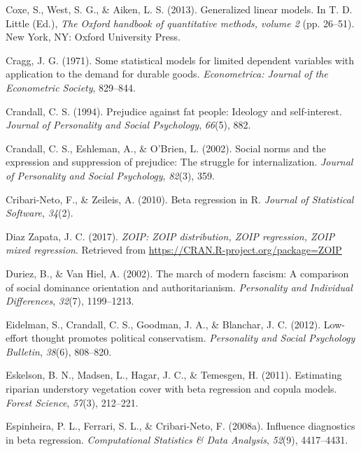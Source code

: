 \documentclass[english,man]{apa6}
\newcounter{author}
\theoremstyle{definition}
\theoremstyle{definition}
\theoremstyle{remark}
\begin{document}
\hypertarget{ref-coxe2013generalized}{}
Coxe, S., West, S. G., \& Aiken, L. S. (2013). Generalized linear
models. In T. D. Little (Ed.), \emph{The Oxford handbook of quantitative
methods, volume 2} (pp. 26--51). New York, NY: Oxford University Press.

\hypertarget{ref-cragg1971some}{}
Cragg, J. G. (1971). Some statistical models for limited dependent
variables with application to the demand for durable goods.
\emph{Econometrica: Journal of the Econometric Society}, 829--844.

\hypertarget{ref-crandall1994prejudice}{}
Crandall, C. S. (1994). Prejudice against fat people: Ideology and
self-interest. \emph{Journal of Personality and Social Psychology},
\emph{66}(5), 882.

\hypertarget{ref-crandall2002social}{}
Crandall, C. S., Eshleman, A., \& O'Brien, L. (2002). Social norms and
the expression and suppression of prejudice: The struggle for
internalization. \emph{Journal of Personality and Social Psychology},
\emph{82}(3), 359.

\hypertarget{ref-cribarineto2010beta}{}
Cribari-Neto, F., \& Zeileis, A. (2010). Beta regression in R.
\emph{Journal of Statistical Software}, \emph{34}(2).

\hypertarget{ref-zoip2017}{}
Diaz Zapata, J. C. (2017). \emph{ZOIP: ZOIP distribution, ZOIP
regression, ZOIP mixed regression}. Retrieved from
\url{https://CRAN.R-project.org/package=ZOIP}

\hypertarget{ref-duriez2002march}{}
Duriez, B., \& Van Hiel, A. (2002). The march of modern fascism: A
comparison of social dominance orientation and authoritarianism.
\emph{Personality and Individual Differences}, \emph{32}(7), 1199--1213.

\hypertarget{ref-eidelman2012low}{}
Eidelman, S., Crandall, C. S., Goodman, J. A., \& Blanchar, J. C.
(2012). Low-effort thought promotes political conservatism.
\emph{Personality and Social Psychology Bulletin}, \emph{38}(6),
808--820.

\hypertarget{ref-eskelson2011estimating}{}
Eskelson, B. N., Madsen, L., Hagar, J. C., \& Temesgen, H. (2011).
Estimating riparian understory vegetation cover with beta regression and
copula models. \emph{Forest Science}, \emph{57}(3), 212--221.

\hypertarget{ref-espinheira2008influence}{}
Espinheira, P. L., Ferrari, S. L., \& Cribari-Neto, F. (2008a).
Influence diagnostics in beta regression. \emph{Computational Statistics
\& Data Analysis}, \emph{52}(9), 4417--4431.
\end{document}
